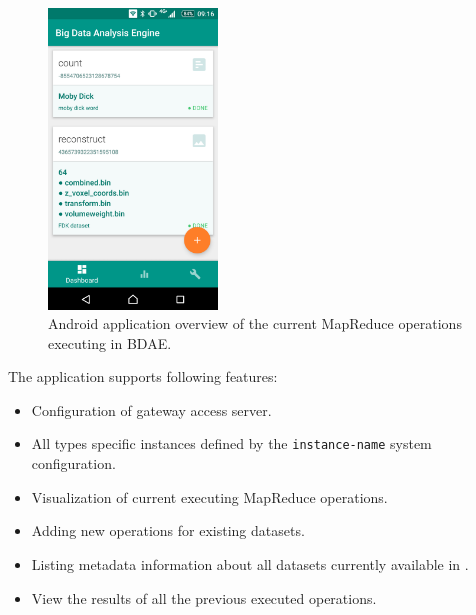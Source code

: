 \begin{figure}[h!]
	\centering
	\vspace*{4mm}
	\includegraphics[width=0.4\textwidth]{img/overview.png}
	\caption[Android application overview]{Android application overview of the current MapReduce operations executing in BDAE. \label{fig:app-overview}}
	\vspace*{4mm}
\end{figure}

\noindent
The application supports following features:
\begin{itemize}
	\item Configuration of gateway access server.
	\item All types \CodeName specific instances defined by the \texttt{instance-name} system configuration.
	\item Visualization of current executing MapReduce operations.
	\item Adding new operations for existing datasets.
	\item Listing metadata information about all datasets currently available in \CodeName.
	\item View the results of all the previous executed operations.
\end{itemize}